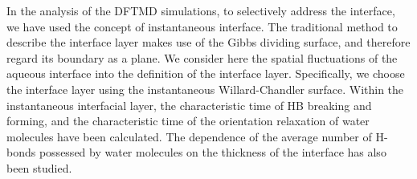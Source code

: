 In the analysis of the DFTMD simulations, to selectively address the interface, we 
have used the concept of instantaneous interface. 
The traditional method to describe the interface layer makes use of the Gibbs dividing surface, and therefore regard its boundary as a plane.
We consider here the spatial fluctuations of the aqueous interface into the definition of the interface layer. 
Specifically, we choose the interface layer using the instantaneous Willard-Chandler surface. 
Within the instantaneous interfacial layer, the characteristic time of HB breaking and forming, 
and the characteristic time of the orientation relaxation of water molecules have been calculated. 
The dependence of the average number of H-bonds possessed by water molecules 
on the thickness of the interface has also been studied. 

